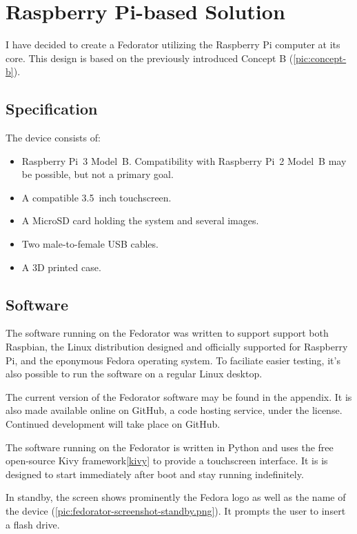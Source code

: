 \chapter{Raspberry Pi-based Solution}
    I have decided to create a Fedorator utilizing the Raspberry Pi computer at its core.  This design is based on the previously introduced Concept B (\ref{pic:concept-b}).
    \section{Specification}
        The device consists of:
        \begin{itemize}
            \item Raspberry Pi~3 Model~B.  Compatibility with Raspberry Pi~2 Model~B may be possible, but not a primary goal.
            \item A compatible 3.5~inch touchscreen.
            \item A MicroSD card holding the system and several images.
            \item Two male-to-female USB cables.
            \item A 3D printed case.
        \end{itemize}
    
    \section{Software}
        The software running on the Fedorator was written to support support both Raspbian, the Linux distribution designed and officially supported for Raspberry Pi\cite{raspian}, and the eponymous Fedora operating system.  To faciliate easier testing, it's also possible to run the software on a regular Linux desktop.
        
        The current version of the Fedorator software may be found in the appendix.  It is also made available online on GitHub, a code hosting service, under the  license\cite{fedorator-github}.  Continued development will take place on GitHub.  
        
        The software running on the Fedorator is written in Python and uses the free open-source Kivy framework\ref{kivy} to provide a touchscreen interface.  It is is designed to start immediately after boot and stay running indefinitely.
        
        In standby, the screen shows prominently the Fedora logo as well as the name of the device (\ref{pic:fedorator-screenshot-standby.png}).  It prompts the user to insert a flash drive.
        
